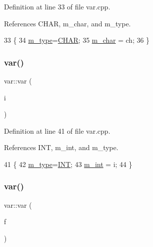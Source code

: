 Definition at line 33 of file var.\+cpp.



References C\+H\+AR, m\+\_\+char, and m\+\_\+type.


\begin{DoxyCode}
33                   \{
34   \hyperlink{classvar_afd0bde61955d8a7541d3dcedc22ec2ad}{m\_type}=\hyperlink{classvar_ae4f9e2c747c3e72f245b148146b1855eae9bfb9b218ebe0917ff49ad2dc74eea8}{CHAR};
35   \hyperlink{classvar_afffb29be23233ae232502023719da1d3}{m\_char} = ch;
36 \}
\end{DoxyCode}
\mbox{\label{classvar_a5fc966797c6c91705d714f5401b18eee}} 
\subsubsection{\texorpdfstring{var()}{var()}\hspace{0.1cm}{\footnotesize\ttfamily [3/6]}}
{\footnotesize\ttfamily var\+::var (\begin{DoxyParamCaption}\item[{int}]{i }\end{DoxyParamCaption})}



Definition at line 41 of file var.\+cpp.



References I\+NT, m\+\_\+int, and m\+\_\+type.


\begin{DoxyCode}
41                 \{
42   \hyperlink{classvar_afd0bde61955d8a7541d3dcedc22ec2ad}{m\_type}=\hyperlink{classvar_ae4f9e2c747c3e72f245b148146b1855eae8b4ab776b56b78d2f219c9666e6ffbf}{INT};
43   \hyperlink{classvar_a2796c70baa395a5e2c5457df760249d7}{m\_int} = i;
44 \}
\end{DoxyCode}
\mbox{\label{classvar_ab11a35ca2d25eed124494fc27f29f311}} 
\subsubsection{\texorpdfstring{var()}{var()}\hspace{0.1cm}{\footnotesize\ttfamily [4/6]}}
{\footnotesize\ttfamily var\+::var (\begin{DoxyParamCaption}\item[{float}]{f }\end{DoxyParamCaption})}



